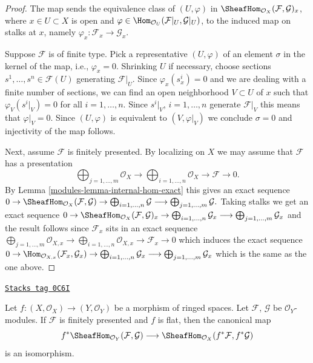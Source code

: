 \begin{proof}

The map sends the equivalence class of
$(U, \varphi)$ in $\SheafHom_{\mathcal{O}_X}(\mathcal{F}, \mathcal{G})_x$,
where $x \in U \subset X$ is open and
$\varphi \in \Hom_{\mathcal{O}_U}(\mathcal{F}|_U, \mathcal{G}|_U)$,
to the induced map on stalks at $x$, namely
$\varphi_x : \mathcal{F}_x \to \mathcal{G}_x$.

\medskip\noindent
Suppose $\mathcal{F}$ is of finite type.
Pick a representative $(U, \varphi)$ of an element $\sigma$
in the kernel of the map, i.e., $\varphi_x = 0$.
Shrinking $U$ if necessary, choose sections
$s^1, \ldots, s^n \in \mathcal{F}(U)$ generating $\mathcal{F}|_U$.
Since $\varphi_x(s^i_x) = 0$
and we are dealing with a finite number of sections,
we can find an open neighborhood
$V \subset U$ of $x$ such that $\varphi_V(s^i|_V)=0$
for all $i = 1, \ldots, n$. Since $s^i|_V$, $i = 1, \ldots, n$ generate
$\mathcal{F}|_V$ this means that $\varphi|_V = 0$.
Since $(U, \varphi)$ is equivalent to $(V, \varphi|_V)$
we conclude $\sigma = 0$ and injectivity of the map follows.

\medskip\noindent
Next, assume $\mathcal{F}$ is finitely presented.
By localizing on $X$ we may assume that $\mathcal{F}$ has a presentation
$$
\bigoplus\nolimits_{j = 1, \ldots, m}
\mathcal{O}_X
\longrightarrow
\bigoplus\nolimits_{i = 1, \ldots, n}
\mathcal{O}_X
\to
\mathcal{F}
\to
0.
$$
By Lemma \ref{modules-lemma-internal-hom-exact} this gives an exact sequence
$
0 \to
\SheafHom_{\mathcal{O}_X}(\mathcal{F}, \mathcal{G}) \to
\bigoplus\nolimits_{i = 1, \ldots, n} \mathcal{G}
\longrightarrow
\bigoplus\nolimits_{j = 1, \ldots, m} \mathcal{G}.
$
Taking stalks we get an exact sequence
$
0 \to
\SheafHom_{\mathcal{O}_X}(\mathcal{F}, \mathcal{G})_x \to
\bigoplus\nolimits_{i = 1, \ldots, n} \mathcal{G}_x
\longrightarrow
\bigoplus\nolimits_{j = 1, \ldots, m} \mathcal{G}_x
$
and the result follows since $\mathcal{F}_x$ sits in
an exact sequence
$
\bigoplus\nolimits_{j = 1, \ldots, m}
\mathcal{O}_{X, x}
\longrightarrow
\bigoplus\nolimits_{i = 1, \ldots, n}
\mathcal{O}_{X, x}
\to
\mathcal{F}_x
\to
0
$
which induces the exact sequence
$
0 \to
\Hom_{\mathcal{O}_{X, x}}(\mathcal{F}_x, \mathcal{G}_x) \to
\bigoplus\nolimits_{i = 1, \ldots, n} \mathcal{G}_x
\longrightarrow
\bigoplus\nolimits_{j = 1, \ldots, m} \mathcal{G}_x
$
which is the same as the one above.
\end{proof}

\begin{lemma}
\label{modules-lemma-pullback-internal-hom}
\href{https://stacks.math.columbia.edu/tag/0C6I}{\texttt{Stacks tag 0C6I}}

Let $f : (X, \mathcal{O}_X) \to (Y, \mathcal{O}_Y)$ be a morphism
of ringed spaces. Let $\mathcal{F}$, $\mathcal{G}$ be $\mathcal{O}_Y$-modules.
If $\mathcal{F}$ is finitely presented and $f$ is flat,
then the canonical map
$$
f^*\SheafHom_{\mathcal{O}_Y}(\mathcal{F}, \mathcal{G})
\longrightarrow
\SheafHom_{\mathcal{O}_X}(f^*\mathcal{F}, f^*\mathcal{G})
$$
is an isomorphism.
\end{lemma}

